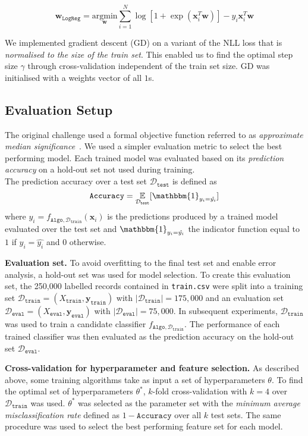 \documentclass[10pt,conference,compsocconf]{IEEEtran}
\newcommand{\parabf}[1]{\vspace{1mm}\noindent\textbf{#1}}
\newcommand{\Deval}{\mathcal{D}_{\mathtt{eval}}}
\newcommand{\Dtrain}{\mathcal{D}_{\mathtt{train}}}
\newcommand{\Dtest}{\mathcal{D}_{\mathtt{test}}}
\newcommand{\Xtrain}{X_{\mathtt{train}}}
\newcommand{\ytrain}{\mathbf{y}_{\mathtt{train}}}
\newcommand{\Xeval}{X_{\mathtt{eval}}}
\newcommand{\yeval}{\mathbf{y}_{\mathtt{eval}}}
\newcommand{\features}{\mathbf{x}_i}
\newcommand{\target}{y_i}
\newcommand{\weights}{\mathbf{w}}
\newcommand{\classifier}[2]{f_{#1, #2}}
\newcommand{\Train}{\mathtt{Algo}}
\newcommand{\LogReg}{\mathtt{LogReg}}
\begin{document}
\vspace*{-4mm}
\begin{equation}
	\weights_\LogReg = \underset{\weights}{\text{argmin}} \sum_{i=1}^{N} \log [ 1 + \exp(\features^T\weights) ] - \target\features^T\weights
\end{equation} 

We implemented gradient descent (GD) on a variant of the NLL loss that is \emph{normalised to the size of the train set}. This enabled us to find the optimal step size $\gamma$ through cross-validation independent of the train set size. GD was initialised with a weights vector of all $1$s.

\subsection{Evaluation Setup}
The original challenge used a formal objective function referred to as \emph{approximate median significance}~\cite{HiggsML}. We used a simpler evaluation metric to select the best performing model. Each trained model was evaluated based on its \emph{prediction accuracy} on a hold-out set not used during training.\\
The prediction accuracy over a test set $\Dtest$ is defined as
\begin{equation}
	\mathtt{Accuracy} = \underset{\Dtest}{\mathbb{E}}[ \mathbbm{1}_{\target = \hat{\target}} ]
\end{equation}
where $\hat{\target} = \classifier{\Train}{\Dtrain}(\features)$ is the predictions produced by a trained model evaluated over the test set and $\mathbbm{1}_{\target = \hat{\target}}$ the indicator function equal to $1$ if $\target = \hat{\target}$ and $0$ otherwise.

\parabf{Evaluation set.} To avoid overfitting to the final test set and enable error analysis, a hold-out set was used for model selection. To create this evaluation set, the 250,000 labelled records contained in \texttt{train.csv} were split into a training set $\Dtrain = (\Xtrain, \ytrain)$ with $|\Dtrain| = 175,000$ and an evaluation set $\Deval = (\Xeval, \yeval)$ with $|\Deval| = 75,000$. In subsequent experiments, $\Dtrain$ was used to train a candidate classifier $\classifier{\Train}{\Dtrain}$. The performance of each trained classifier was then evaluated as the prediction accuracy on the hold-out set $\Deval$.

\parabf{Cross-validation for hyperparameter and feature selection.} As described above, some training algorithms take as input a set of hyperparameters $\theta$. To find the optimal set of hyperparameters $\theta^*$, $k$-fold cross-validation with $k=4$ over $\Dtrain$ was used. $\theta^*$ was selected as the parameter set with the \emph{minimum average misclassification rate} defined as $1 - \mathtt{Accuracy}$ over all $k$ test sets. The same procedure was used to select the best performing feature set for each model.\\
\end{document}
